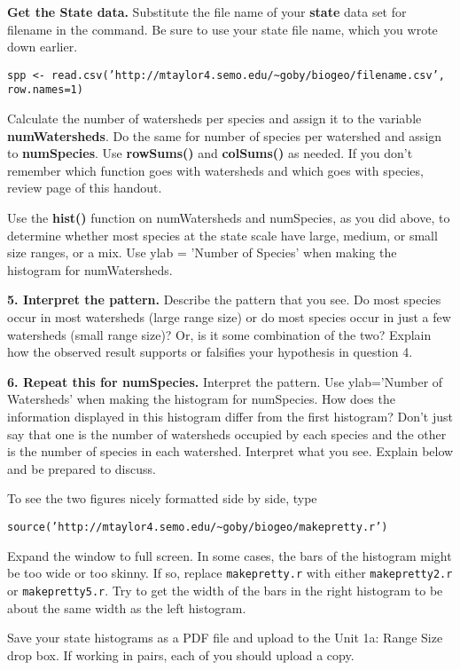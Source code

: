 \documentclass[11pt]{article}
\begin{document}
\vspace{7\baselineskip}

\textbf{Get the State data.} Substitute the file name of your \textbf{state} data set for filename in
the command. Be sure to use your state file name, which you wrote down
earlier.

\texttt{spp \textless{}-
read.csv('http://mtaylor4.semo.edu/\textasciitilde{}goby/biogeo/filename.csv', row.names=1)}

Calculate the number of watersheds per species and assign it to the
variable \textbf{numWatersheds}. Do the same for number of species per
watershed and assign to \textbf{numSpecies}. Use \textbf{rowSums()} and
\textbf{colSums()} as needed. If you don't remember which function goes
with watersheds and which goes with species, review page \pageref{tab:colrowsums} of this handout.

Use the \textbf{hist()} function on numWatersheds and numSpecies, as you did above,
to determine whether most species at the state scale have large, medium, or
small size ranges, or a mix.  Use ylab = 'Number of Species' when making the histogram
for numWatersheds. 

\textbf{5. Interpret the pattern.} Describe the pattern that you see. Do most
species occur in most watersheds (large range size) or do most species
occur in just a few watersheds (small range size)? Or, is it some
combination of the two? Explain how the observed result supports or
falsifies your hypothesis in question 4.

\vspace{7\baselineskip}
\newpage

\textbf{6. Repeat this for numSpecies.} Interpret the pattern. 
Use ylab='Number of Watersheds' when making the histogram for numSpecies.
How does the information displayed in this histogram differ from the first histogram?
Don't just say that one is the number of watersheds occupied by each
species and the other is the number of species in each watershed.
Interpret what you see. Explain below and be prepared to discuss.

\vspace{7\baselineskip}


To see the two figures nicely formatted side by side, type

\texttt{source('http://mtaylor4.semo.edu/\textasciitilde{}goby/biogeo/makepretty.r')}

Expand the window to full screen. In some cases, the bars of the histogram might be too wide or too skinny. If so, replace \texttt{makepretty.r} with either \texttt{makepretty2.r} or \texttt{makepretty5.r}. Try to get the width of the bars in the right histogram to be about the same width as the left histogram.

Save your state histograms as a PDF file and upload to the Unit 1a: Range Size drop box. If working in pairs, each of you should upload a copy.
\end{document}

